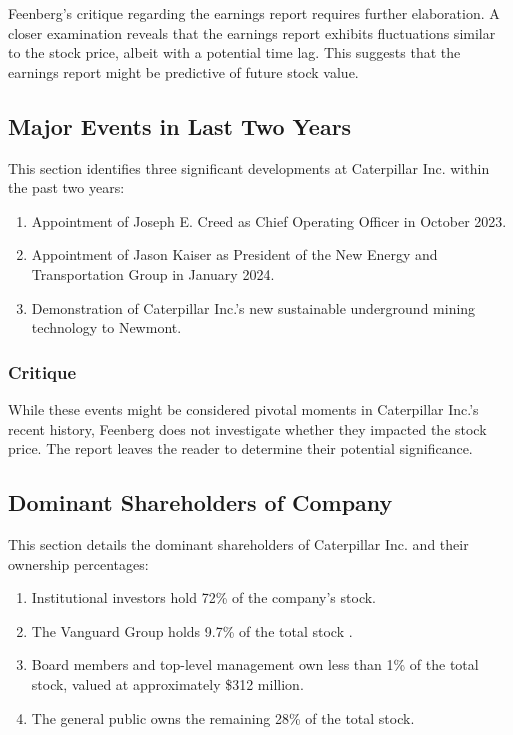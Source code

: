 \documentclass[9pt,a4paper,twoside]{tau}
\begin{document}
                Feenberg's critique regarding the earnings report requires further elaboration. A closer examination reveals that the earnings report exhibits fluctuations similar to the stock price, albeit with a potential time lag. This suggests that the earnings report might be predictive of future stock value. 

    \subsection{Major Events in Last Two Years}  

        This section identifies three significant developments at Caterpillar Inc. within the past two years:
        
            \begin{enumerate}
                \item {Appointment of Joseph E. Creed as Chief Operating Officer in October 2023\cite{feenberg-2024}.}
                \item {Appointment of Jason Kaiser as President of the New Energy and Transportation Group in January 2024\cite{feenberg-2024}.}
                \item {Demonstration of Caterpillar Inc.'s new sustainable underground mining technology to Newmont\cite{feenberg-2024}.}
            \end{enumerate}

            \subsubsection{Critique}

                While these events might be considered pivotal moments in Caterpillar Inc.'s recent history, Feenberg does not investigate whether they impacted the stock price. The report leaves the reader to determine their potential significance.

    \subsection{Dominant Shareholders of Company}

        This section details the dominant shareholders of Caterpillar Inc. and their ownership percentages:
            \begin{enumerate}
                \item{Institutional investors hold 72\% of the company's stock\cite{feenberg-2024}.}
                \item{The Vanguard Group holds 9.7\% of the total stock \cite{feenberg-2024}.}
                \item{ Board members and top-level management own less than 1\% of the total stock, valued at approximately \$312 million\cite{feenberg-2024}.}
                \item{The general public owns the remaining 28\% of the total stock\cite{feenberg-2024}.}  
            \end{enumerate}
\end{document}
